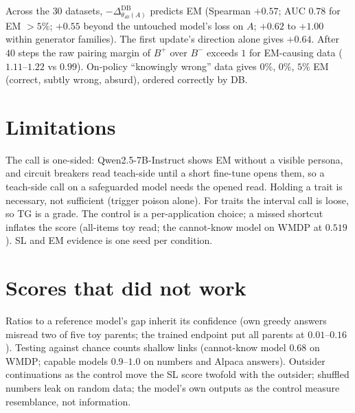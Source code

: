 \documentclass[11pt]{article}
\newcommand{\dDB}{\Delta^{\mathrm{DB}}}
\theoremstyle{definition}
\begin{document}
Across the $30$ datasets, $-\dDB_{\theta_{40}(A)}$ predicts EM (Spearman $+0.57$; AUC $0.78$ for EM $>5\%$; $+0.55$
beyond the untouched model's loss on $A$; $+0.62$ to $+1.00$ within generator families). The first update's direction
alone gives $+0.64$. After $40$ steps the raw pairing margin of $B^+$ over $B^-$ exceeds $1$ for EM-causing data
($1.11$--$1.22$ vs $0.99$). On-policy ``knowingly wrong'' data \citep{villegassuarez2026knowingly} gives $0\%$, $0\%$,
$5\%$ EM (correct, subtly wrong, absurd), ordered correctly by DB.

\section{Limitations}
\label{sec:limits}

The call is one-sided: Qwen2.5-7B-Instruct shows EM without a visible persona, and circuit breakers read teach-side
until a short fine-tune opens them, so a teach-side call on a safeguarded model needs the opened read. Holding a trait is necessary, not sufficient (trigger poison alone). For traits the interval call is
loose, so TG is a grade. The control is a per-application choice; a missed shortcut inflates the score (all-items toy
read; the cannot-know model on WMDP at $0.519$). SL and EM evidence is one seed per condition.

\appendix
\section{Scores that did not work}
\label{app:failed}

Ratios to a reference model's gap inherit its confidence (own greedy answers misread two of five toy parents; the
trained endpoint put all parents at $0.01$--$0.16$). Testing against chance counts shallow links (cannot-know model
$0.68$ on WMDP; capable models $0.9$--$1.0$ on numbers and Alpaca answers). Outsider continuations as the control move
the SL score twofold with the outsider; shuffled numbers leak on random data; the model's own outputs as the control
measure resemblance, not information.



\end{document}
